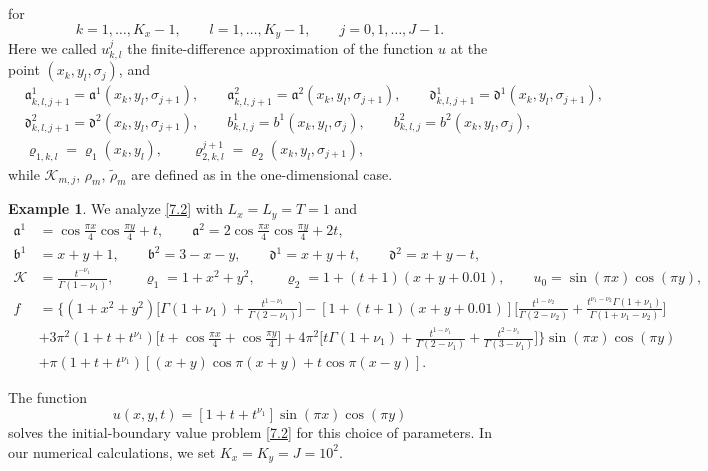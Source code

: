 \documentclass[reqno]{amsart}
\theoremstyle{definition}
\numberwithin{equation}{section}
\newtheorem{exAPP}{Example}[section]
\begin{document}
for
$$k = 1,\ldots,  K_x-1, \qquad l = 1,\ldots,  K_y-1, \qquad j = 0,1,\ldots,  J-1.$$
Here we called $u_{k,l}^{j}$
the finite-difference approximation of the function $u$ at the point $(x_k,y_l,\sigma_j)$,
and
\begin{align*}
&\mathfrak{a}^{1}_{k,l,j+1} = \mathfrak{a}^{1}(x_k, y_{l},\sigma_{j+1}),
\qquad \mathfrak{a}^{2}_{k,l,j+1} = \mathfrak{a}^{2}(x_k, y_{l},\sigma_{j+1}),\qquad
\mathfrak{d}^{1}_{k,l,j+1}  = \mathfrak{d}^{1}(x_k, y_{l},\sigma_{j+1}),
\\
&
\mathfrak{d}^{2}_{k,l,j+1}  = \mathfrak{d}^{2}(x_k, y_{l},\sigma_{j+1}),
\qquad
b^{1}_{k,l,j} = b^{1}(x_k,y_l, \sigma_j),\qquad b^2_{k,l,j} = b^{2}(x_k,y_l, \sigma_j),\\
&
  \varrho_{1,k,l} = \varrho_1(x_k,y_l),\qquad \varrho^{j+1}_{2,k,l} = \varrho_{2}(x_k, y_l,\sigma_{j+1}),
\end{align*}
while $\mathcal{K}_{m,j}$, $\rho_{m}$, $\tilde{\rho}_{m}$ are defined 
as in the one-dimensional case.
\begin{exAPP}\label{e.4}
We analyze \eqref{7.2} with $L_x=L_y=T=1$ and
\begin{align*}
\mathfrak{a}^{1}&=\cos\frac{\pi x}{4}\cos\frac{\pi y}{4}+t,\qquad \mathfrak{a}^{2}=2\cos\frac{\pi x}{4}\cos\frac{\pi y}{4}+2t,\\
\mathfrak{b}^{1}&=x+y+1,\qquad \mathfrak{b}^{2}=3-x-y,\qquad \mathfrak{d}^{1}=x+y+t,\qquad \mathfrak{d}^{2}=x+y-t,
\\
\mathcal{K}&=\frac{t^{-\nu_{1}}}{\Gamma(1-\nu_{1})},\qquad
\varrho_1=1+x^{2}+y^{2},\qquad\varrho_{2}=1+(t+1)(x+y+0.01),\qquad u_0=\sin(\pi x)\cos(\pi y),\\
 f&=\bigg\{
(1+x^{2}+y^{2})\bigg[\Gamma(1+\nu_{1})+\frac{t^{1-\nu_{1}}}{\Gamma(2-\nu_{1})}\bigg]-[1+(t+1)(x+y+0.01)]
\bigg[\frac{t^{1-\nu_2}}{\Gamma(2-\nu_2)}+\frac{t^{\nu_{1}-\nu_2}\Gamma(1+\nu_{1})}{\Gamma(1+\nu_{1}-\nu_2)}\bigg]\\
&
+
3\pi^2(1+t+t^{\nu_{1}})\bigg[t+\cos\frac{\pi x}{4}+\cos\frac{\pi y}{4}\bigg]
+
4\pi^2\bigg[t\Gamma(1+\nu_{1})+\frac{t^{1-\nu_{1}}}{\Gamma(2-\nu_{1})}+\frac{t^{2-\nu_{1}}}{\Gamma(3-\nu_{1})}\bigg]
\bigg\}\sin(\pi x)\cos(\pi y)\\
&
+
\pi(1+t+t^{\nu_{1}})[(x+y)\cos\pi(x+y)+t\cos\pi(x-y)].
\end{align*}
\end{exAPP}
The function
\[
u(x,y,t)=[1+t+t^{\nu_{1}}]\sin(\pi x)\cos(\pi y)
\]
solves the initial-boundary value problem \eqref{7.2}
for this choice of parameters. In our numerical calculations, we set $K_x=K_y=J=10^{2}$.
\end{document}
